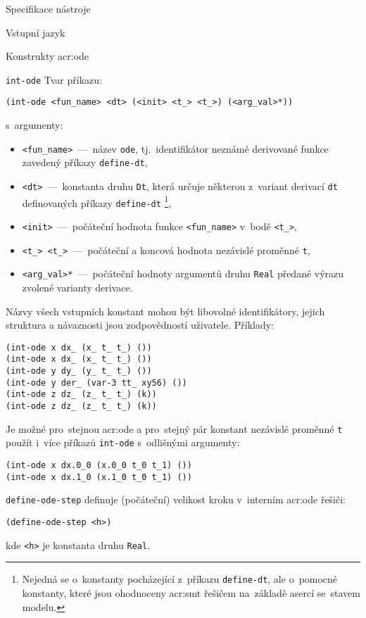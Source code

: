 \documentclass[thesis=M,czech]{FITthesis}[2012/06/26]
\newcommand{\acrlabel}[1]{acr:#1}
\newcommand{\acr}[1]{\acrshort{\acrlabel{#1}}}
\newcommand{\id}[1]{\texttt{#1}}
\begin{document}
\begin{section}{Specifikace nástroje}
\begin{subsection}{Vstupní jazyk}
\begin{subsubsection}{Konstrukty \acr{ode}}
\begin{paragraph}{\id{int-ode}}
Tvar příkazu:
\begin{center}
\id{(int-ode <fun\_\-name> <dt> (<init> <t\_> <t\_>) (<arg\_\-val>*))}
\end{center}
s~argumenty:
\begin{itemize}
\item \id{<fun\_\-name>}~---~název \id{ode},
   tj.~identifikátor neznámé derivované funkce
   zavedený příkazy \id{define\--dt},
\item \id{<dt>}~---~konstanta druhu \id{Dt}, která určuje
   některou z~variant derivací \id{dt} definovaných příkazy \id{define\--dt}%
   \footnote{Nejedná se o~konstanty pocházející z~příkazu \id{define\--dt},
   ale o~pomocné konstanty, které jsou ohodnoceny \acr{smt} řešičem
   na~základě asercí se~stavem modelu.},
\item \id{<init>}~---~počáteční hodnota funkce \id{<fun\_\-name>}
   v~bodě \id{<t\_>},
\item \id{<t\_\-1> <t\_>}~---~počáteční a koncová hodnota
   nezávislé proměnné \id{t},
\item \id{<arg\_\-val>*}~---~počáteční hodnoty argumentů druhu \id{Real}
   předané výrazu zvolené varianty derivace.
\end{itemize}
Názvy všech vstupních konstant mohou být libovolné identifikátory,
jejich struktura a návaznosti jsou zodpovědností uživatele.
Příklady:
\begin{center}
\id{(int-ode x dx\_ (x\_\-0 t\_\-0 t\_) ())} \\
\id{(int-ode x dx\_\-1 (x\_\-1 t\_ t\_) ())} \\
\id{(int-ode y dy\_\-1 (y\_\-1 t\_\-1 t\_\-2) ())} \\
\id{(int-ode y der\_ (var-3 tt\_ xy56) ())} \\
\id{(int-ode z dz\_ (z\_\-1 t\_ t\_) (k))} \\
\id{(int-ode z dz\_\-2 (z\_\-1 t\_\-1 t\_) (k))}
\end{center}

Je možné pro~stejnou \acr{ode}
a pro~stejný pár konstant nezávislé proměnné \id{t}
použít i~více příkazů \id{int\--ode}
s~odlišnými argumenty:
\begin{Verbatim}[samepage=true]
(int-ode x dx.0_0 (x.0_0 t_0 t_1) ())
(int-ode x dx.1_0 (x.1_0 t_0 t_1) ())
\end{Verbatim}
\end{paragraph} %


\begin{paragraph}{\id{define-ode-step}}\label{p:design:spec:ilang:ode:step}
definuje (počáteční) velikost kroku
v~interním \acr{ode} řešiči:
\begin{center}
\id{(define-ode-step <h>)}
\end{center}
kde \id{<h>} je konstanta druhu \id{Real}.
\end{paragraph} %


\end{subsubsection}
\end{subsection}
\end{section}
\end{document}
